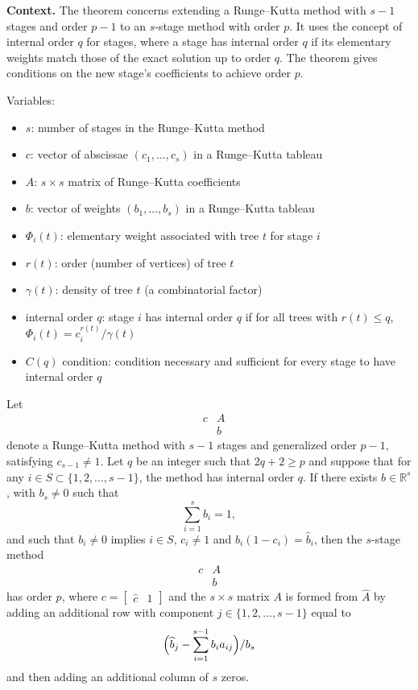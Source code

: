 \noindent\textbf{Context.}
The theorem concerns extending a Runge--Kutta method with $s-1$ stages and order $p-1$ to an $s$-stage method with order $p$. It uses the concept of internal order $q$ for stages, where a stage has internal order $q$ if its elementary weights match those of the exact solution up to order $q$. The theorem gives conditions on the new stage's coefficients to achieve order $p$.

Variables:
\begin{itemize}
    \item $s$: number of stages in the Runge--Kutta method
    \item $c$: vector of abscissae $(c_{1},\dots,c_{s})$ in a Runge--Kutta tableau
    \item $A$: $s \times s$ matrix of Runge--Kutta coefficients
    \item $b$: vector of weights $(b_{1},\dots,b_{s})$ in a Runge--Kutta tableau
    \item $\Phi_{i}(t)$: elementary weight associated with tree $t$ for stage $i$
    \item $r(t)$: order (number of vertices) of tree $t$
    \item $\gamma(t)$: density of tree $t$ (a combinatorial factor)
    \item internal order $q$: stage $i$ has internal order $q$ if for all trees with $r(t) \le q$, $\Phi_{i}(t) = c_{i}^{r(t)} / \gamma(t)$
    \item $C(q)$ condition: condition necessary and sufficient for every stage to have internal order $q$
\end{itemize}

\begin{theorem}

  \label{thm:323B}
Let
\[
\begin{array}{ccc}
 & c & A \\
 & & b
\end{array}
\]
denote a Runge--Kutta method with \( s - 1 \) stages and generalized order \( p - 1 \),
satisfying \( c_{s-1} \neq 1 \). Let \( q \) be an integer such that \( 2q + 2 \ge p \) and suppose that
for any \( i \in S \subset \{ 1, 2, \dots, s-1 \} \), the method has internal order \( q \). If there
exists \( b \in \mathbb{R}^s \), with \( b_s \neq 0 \) such that
\[
\sum_{i=1}^{s} b_i = 1, \tag{323g}
\]
and such that \( b_i \neq 0 \) implies \( i \in S \), \( c_i \neq 1 \) and \( b_i(1-c_i) = \widehat{b}_i \), then the \( s \)-stage
method
\[
\begin{array}{ccc}
c & A \\
 & b
\end{array}
\]
has order \( p \), where \( c = \begin{bmatrix} \widehat{c} & 1 \end{bmatrix} \) and the \( s \times s \) matrix \( A \) is formed from \( \widehat{A} \)
by adding an additional row with component \( j \in \{ 1, 2, \dots, s-1 \} \) equal to
\[
\Bigl( \widehat{b}_j - \sum_{i=1}^{s-1} b_i a_{ij} \Bigr) / b_s
\]
and then adding an additional column of \( s \) zeros.
\end{theorem}

